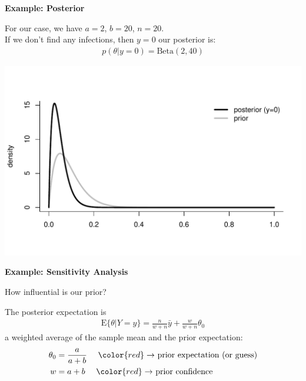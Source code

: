 \documentclass[12pt,xcolor=svgnames]{beamer}
\newcommand{\rd}{\color{red}}
\newcommand{\theme}{\color{FireBrick}}
\newcommand{\mr}[1]{\mathrm{#1}}
\newcommand{\sk}{\vspace{.4cm}}
\newcommand{\chap}[1]{{\theme \Large \bf #1} \sk}
\begin{document}
\begin{frame}
\chap{Example: Posterior}

For our case, we have $a=2$, $b=20$, $n=20$. \\

If we don't find any infections, then $y=0$ our posterior is:
\begin{align*}
p(\theta|y=0)=\mr{Beta}(2, 40)
\end{align*}
\begin{center}
\includegraphics[scale=0.55,trim=10 50 0 60]{beta_bin_posterior}
\end{center}

\end{frame}

\begin{frame}
\chap{Example: Sensitivity Analysis }

How influential is our prior?

The posterior expectation is
\begin{align*}
\mr{E}\{\theta|Y=y\} =   \frac{n}{w+n} \bar{y} + \frac{w}{w+n} \theta_0
\end{align*}
a weighted average of the sample mean and the prior expectation:
\begin{align*}
\theta_0 & =  \frac{a}{a+b} ~~~~ {\rd \rightarrow} \text{ prior expectation (or guess)}\\
w & = a + b  ~~~~ {\rd \rightarrow} \text{  prior confidence} 
\end{align*}


\end{frame}
\end{document}
